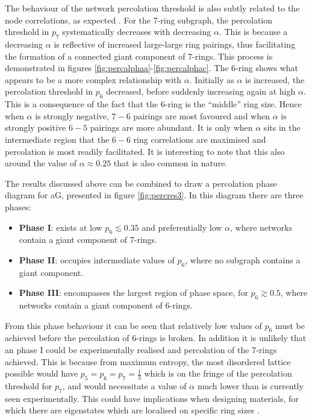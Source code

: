 The behaviour of the network percolation threshold is also subtly related to the node correlations, as expected \cite{Zhou2012,Schmeltzer2014}.
For the 7\--ring subgraph, the percolation threshold in $p_7$ systematically decreases with decreasing $\alpha$.
This is because a decreasing $\alpha$ is reflective of increased large\--large ring pairings, thus facilitating the formation of a connected giant component of 7\--rings.
This process is demonstrated in figures \ref{fig:percalphaa}\--\ref{fig:percalphac}.
The 6\--ring shows what appears to be a more complex relationship with $\alpha$.
Initially as $\alpha$ is increased, the percolation threshold in $p_6$ decreased, before suddenly increasing again at high $\alpha$.
This is a consequence of the fact that the 6\--ring is the ``middle'' ring size. 
Hence when $\alpha$ is strongly negative, $7-6$ pairings are most favoured and when $\alpha$ is strongly positive $6-5$ pairings are more abundant.
It is only when $\alpha$ sits in the intermediate region that the $6-6$ ring correlations are maximised and percolation is most readily facilitated.
It is interesting to note that this also around the value of $\alpha\approx 0.25$ that is also common in nature.

The results discussed above can be combined to draw a percolation phase diagram for aG, presented in figure \ref{fig:percres3}.
In this diagram there are three phases:
\begin{itemize}
	\item \textbf{Phase I}: exists at low $p_6\lesssim 0.35$ and preferentially low $\alpha$, where networks contain a giant component of 7\--rings.
	\item \textbf{Phase II}: occupies intermediate values of $p_6$, where no subgraph contains a giant component.
	\item \textbf{Phase III}: encompasses the largest region of phase space, for $p_6\gtrsim0.5$, where networks contain a giant component of 6\--rings.
\end{itemize}
From this phase behaviour it can be seen that relatively low values of $p_6$ must be achieved before the percolation of 6\--rings is broken.
In addition it is unlikely that an phase I could be experimentally realised and percolation of the 7\--rings achieved. 
This is because from maximum entropy, the most disordered lattice possible would have $p_5=p_6=p_7=\frac{1}{3}$ which is on the fringe of the percolation threshold for $p_7$, and would necessitate a value of $\alpha$ much lower than is currently seen experimentally.
This could have implications when designing materials, for which there are eigenstates which are localised on specific ring sizes \cite{Kapko2010,Zhu2016}.




